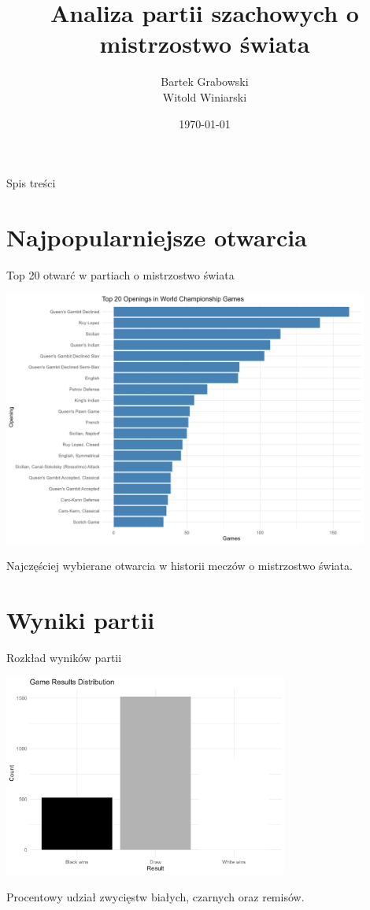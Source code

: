 \documentclass{beamer}
\title{Analiza partii szachowych o mistrzostwo świata}
\author{Bartek Grabowski \\ Witold Winiarski}
\date{\today}
\begin{document}
\frame{\titlepage}

\begin{frame}{Spis treści}
  \tableofcontents
\end{frame}

\section{Najpopularniejsze otwarcia}
\begin{frame}{Top 20 otwarć w partiach o mistrzostwo świata}
  \begin{center}
    \includegraphics[width=0.9\textwidth]{../../ChessPlots/openings_top20.png}
  \end{center}
  \small
  Najczęściej wybierane otwarcia w historii meczów o mistrzostwo świata.
\end{frame}

\section{Wyniki partii}
\begin{frame}{Rozkład wyników partii}
  \begin{center}
    \includegraphics[width=0.7\textwidth]{../../ChessPlots/results_distribution.png}
  \end{center}
  \small
  Procentowy udział zwycięstw białych, czarnych oraz remisów.
\end{frame}
\end{document}
